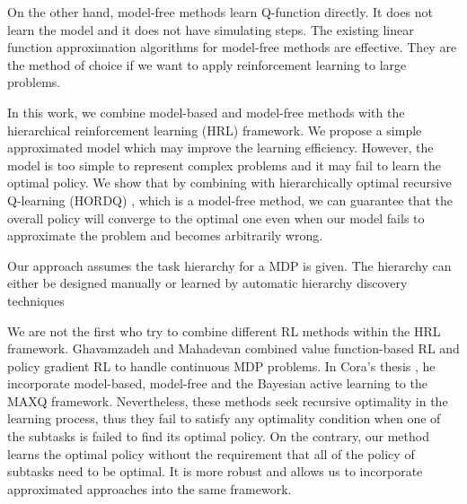 \documentclass{article} %
\begin{document}
On the other hand, model-free methods learn Q-function directly. It does not 
learn the model and it does not have simulating steps.  
The existing linear function approximation algorithms for model-free methods \cite{LSTD99} are effective. 
They are the method of choice if we want to apply reinforcement learning 
to large problems.

In this work, we combine model-based and model-free methods with the hierarchical 
reinforcement learning (HRL) framework. We propose a simple approximated model which 
may improve the learning efficiency. However, the model is too simple to represent
complex problems and it may fail to learn the optimal policy. We show that by combining with 
hierarchically optimal recursive Q-learning (HORDQ) \cite{HORDQ}, which is a model-free method, we can 
guarantee that the overall policy will converge to the optimal one even when our model
fails to approximate the problem and becomes arbitrarily wrong. 

Our approach assumes the task hierarchy for a MDP is given. The hierarchy can either be 
designed manually or learned by automatic hierarchy discovery techniques\cite{HexQ}



We are not the first who try to combine different RL methods within the HRL framework.  
Ghavamzadeh and Mahadevan \cite{HybridPolicy} combined value function-based RL and policy gradient RL to handle
continuous MDP problems. In Cora's thesis \cite{Vlad}, he   
incorporate model-based, model-free and the Bayesian active learning to the MAXQ framework.
Nevertheless, these methods seek recursive optimality in the learning process, 
thus they fail to satisfy any optimality condition when one of the subtasks
is failed to find its optimal policy.
On the contrary, our method learns the optimal policy without the requirement that 
all of the policy of subtasks need to be optimal. It is more robust and allows us to incorporate approximated
approaches into the same framework.


\end{document}
